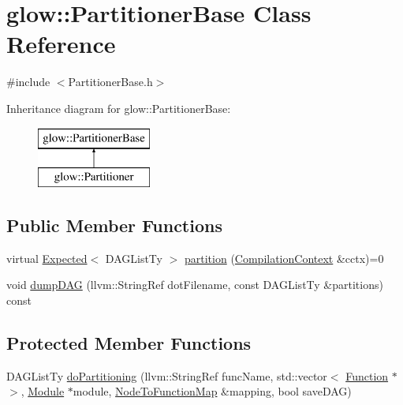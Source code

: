 \hypertarget{classglow_1_1_partitioner_base}{}\section{glow\+:\+:Partitioner\+Base Class Reference}
\label{classglow_1_1_partitioner_base}


{\ttfamily \#include $<$Partitioner\+Base.\+h$>$}

Inheritance diagram for glow\+:\+:Partitioner\+Base\+:\begin{figure}[H]
\begin{center}
\leavevmode
\includegraphics[height=2.000000cm]{classglow_1_1_partitioner_base}
\end{center}
\end{figure}
\subsection*{Public Member Functions}
\begin{DoxyCompactItemize}
\item 
virtual \hyperlink{classglow_1_1detail_1_1_glow_expected}{Expected}$<$ D\+A\+G\+List\+Ty $>$ \hyperlink{classglow_1_1_partitioner_base_ac51c9b3cf875b52d6aa0282aebcc941d}{partition} (\hyperlink{structglow_1_1_compilation_context}{Compilation\+Context} \&cctx)=0
\item 
void \hyperlink{classglow_1_1_partitioner_base_ae4c7498ec2510ff9b226191e5f479d43}{dump\+D\+AG} (llvm\+::\+String\+Ref dot\+Filename, const D\+A\+G\+List\+Ty \&partitions) const
\end{DoxyCompactItemize}
\subsection*{Protected Member Functions}
\begin{DoxyCompactItemize}
\item 
D\+A\+G\+List\+Ty \hyperlink{classglow_1_1_partitioner_base_a6fe7a0c542bd37744dd2667b86cdbf73}{do\+Partitioning} (llvm\+::\+String\+Ref func\+Name, std\+::vector$<$ \hyperlink{classglow_1_1_function}{Function} $\ast$$>$, \hyperlink{classglow_1_1_module}{Module} $\ast$module, \hyperlink{classglow_1_1_node_to_function_map}{Node\+To\+Function\+Map} \&mapping, bool save\+D\+AG)
\end{DoxyCompactItemize}


